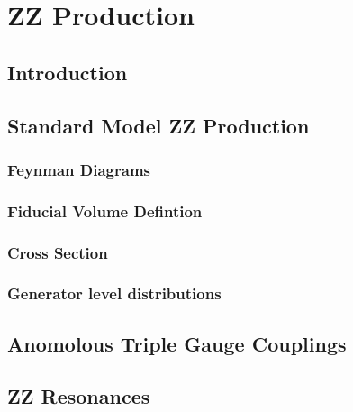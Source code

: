 \graphicspath{{Chapters/TheoryZZProduction/Figures/}}
\chapter{ZZ Production}
\label{chap:TheoryZZProduction}

\section{Introduction}
\section{Standard Model ZZ Production}
\subsection{Feynman Diagrams}
\subsection{Fiducial Volume Defintion}
\subsection{Cross Section}
\subsection{Generator level distributions}
\section{Anomolous Triple Gauge Couplings}
\section{ZZ Resonances}
